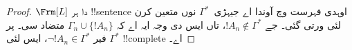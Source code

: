 \documentclass[../../../include/open-logic-section]{subfiles}
\begin{document}
\begin{proof}
$\Frm[L]$ دا ہر !!{sentence} اوہدی فہرست وچ
آوندا اے جیہڑی~$\Gamma^*$ نوں متعین کرن لئی
ورتی گئی۔ جے $!A_n \notin \Gamma^*$، تاں
ایس دی وجہ ایہ اے کہ $\Gamma_n \cup \{!A_n\}$
متضاد سی۔ پر فیر $\lnot !A_n
\in \Gamma^*$، ایس لئی $\Gamma^*$
!!{complete} اے۔
\end{proof}
\end{document}
